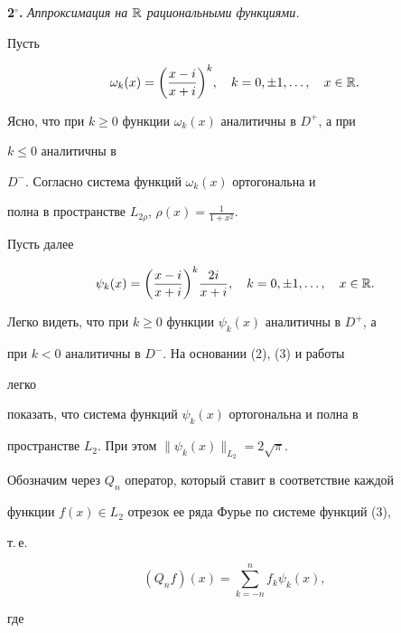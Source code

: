 {\bf 2${}^\circ$.} {\it Аппроксимация на $\Bbb R$ рациональными функциями.} 


Пусть 


\begin{equation} 


\omega_k(x)=\biggl(\frac{x-i}{x+i}\biggr)^k,\quad 


k=0,\pm 1,\dotsc,\quad x\in\Bbb R. 


\end{equation} 


Ясно, что при $k\ge 0$ функции $\omega_k(x)$ аналитичны в $D^+$, а при 


$k\le 0$ аналитичны в 


$D^-$. Согласно \cite{5} система функций $\omega_k(x)$ ортогональна и 


полна в пространстве $L_{2\rho}$, $\rho(x)=\frac{1}{1+x^2}$. 


 


Пусть далее 


\begin{equation} 


\psi_k(x)=\biggl(\frac{x-i}{x+i}\biggr)^k\frac{2i}{x+i}, 


\quad k=0,\pm 1,\dotsc,\quad x\in \Bbb R. 


\end{equation} 


Легко видеть, что при $k\ge 0$ функции $\psi_k(x)$ аналитичны в $D^+$, а 


при $k<0$ аналитичны в $D^-$. На основании (2), (3) и работы \cite{5} 


легко 


показать, что система функций $\psi_k(x)$ ортогональна и полна в 


пространстве $L_2$. При этом $\|\psi_k(x)\|_{L_2}=2\sqrt\pi$. 


 


Обозначим через $Q_n$ оператор, который ставит в соответствие каждой 


функции $f(x)\in L_2$ отрезок ее ряда Фурье по системе функций (3),


т.\,е. 


\begin{equation} 


(Q_n f)(x)=\sum^n_{k=-n}f_k\psi_k(x), 


\end{equation} 


где 



